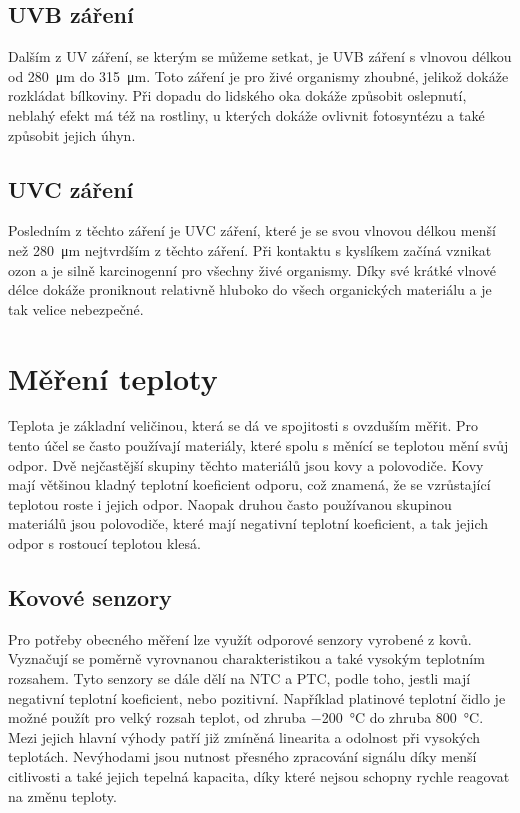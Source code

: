 \subsection{UVB záření}

Dalším z UV záření, se kterým se můžeme setkat, je UVB záření s vlnovou délkou od \SI{280}{\micro\metre} do \SI{315}{\micro\metre}. Toto záření je pro živé organismy zhoubné, jelikož dokáže rozkládat bílkoviny. Při dopadu do lidského oka dokáže způsobit oslepnutí, neblahý efekt má též na rostliny, u kterých dokáže ovlivnit fotosyntézu a také způsobit jejich úhyn.

\subsection{UVC záření}

Posledním z těchto záření je UVC záření, které je se svou vlnovou délkou menší než \SI{280}{\micro\metre} nejtvrdším z těchto záření. Při kontaktu s kyslíkem začíná vznikat ozon a je silně karcinogenní pro všechny živé organismy. Díky své krátké vlnové délce dokáže proniknout relativně hluboko do všech organických materiálu a je tak velice nebezpečné.

\section{Měření teploty}

Teplota je základní veličinou, která se dá ve spojitosti s ovzduším měřit. Pro tento účel se často používají materiály, které spolu s měnící se teplotou mění svůj odpor. Dvě nejčastější skupiny těchto materiálů jsou kovy a polovodiče. Kovy mají většinou kladný teplotní koeficient odporu, což znamená, že se vzrůstající teplotou roste i jejich odpor. Naopak druhou často používanou skupinou materiálů jsou polovodiče, které mají negativní teplotní koeficient, a tak jejich odpor s rostoucí teplotou klesá.

\subsection{Kovové senzory}

Pro potřeby obecného měření lze využít odporové senzory vyrobené z kovů. Vyznačují se poměrně vyrovnanou charakteristikou a také vysokým teplotním rozsahem. Tyto senzory se dále dělí na NTC a PTC, podle toho, jestli mají negativní teplotní koeficient, nebo pozitivní. Například platinové teplotní čidlo je možné použít pro velký rozsah teplot, od zhruba \SI{-200}{\celsius} do zhruba \SI{800}{\celsius}. Mezi jejich hlavní výhody patří již zmíněná linearita a odolnost při vysokých teplotách. Nevýhodami jsou nutnost přesného zpracování signálu díky menší citlivosti a také jejich tepelná kapacita, díky které nejsou schopny rychle reagovat na změnu teploty.

